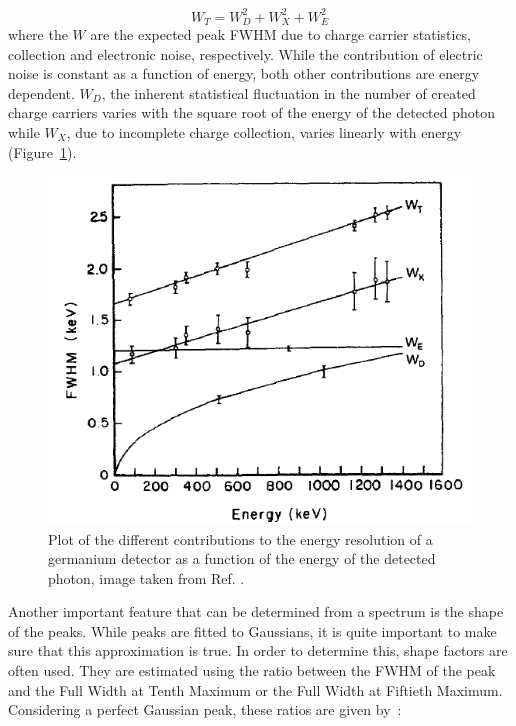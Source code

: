 \documentclass[11pt,a4paper]{article}
\begin{document}
\begin{equation}
W_T = W_D^2 + W_X^2 + W_E^2
\end{equation}
where the $W$ are the expected peak FWHM due to charge carrier statistics, collection and electronic noise, respectively. While the contribution of electric noise is constant as a function of energy, both other contributions are energy dependent. $W_D$, the inherent statistical fluctuation in the number of created charge carriers varies with the square root of the energy of the detected photon while $W_X$, due to incomplete charge collection, varies linearly with energy (Figure~\ref{resolution}).

\begin{figure}
\centering
\includegraphics[scale=0.9]{resolution.png}
\caption{Plot of the different contributions to the energy resolution of a germanium detector as a function of the energy of the detected photon, image taken from Ref. \cite{Knoll}.}
\label{resolution}
\end{figure}

Another important feature that can be determined from a spectrum is the shape of the peaks. While peaks are fitted to Gaussians, it is quite important to make sure that this approximation is true. In order to determine this, shape factors are often used. They are estimated using the ratio between the FWHM of the peak and the Full Width at Tenth Maximum or the Full Width at Fiftieth Maximum. Considering a perfect Gaussian peak, these ratios are given by~:
\end{document}
